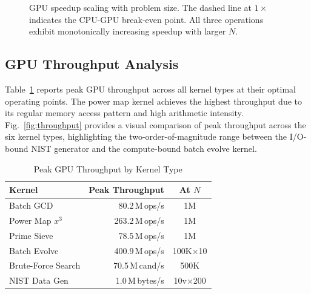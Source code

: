 \documentclass[lettersize,journal]{IEEEtran}
\begin{document}
\begin{figure}[!t]
\centering
{}
\caption{GPU speedup scaling with problem size. The dashed line at $1\times$ indicates the CPU-GPU break-even point. All three operations exhibit monotonically increasing speedup with larger $N$.}
\label{fig:speedup}
\end{figure}

\subsection{GPU Throughput Analysis}

Table~\ref{tab:throughput} reports peak GPU throughput across all kernel types at their optimal operating points. The power map kernel achieves the highest throughput due to its regular memory access pattern and high arithmetic intensity. Fig.~\ref{fig:throughput} provides a visual comparison of peak throughput across the six kernel types, highlighting the two-order-of-magnitude range between the I/O-bound NIST generator and the compute-bound batch evolve kernel.

\begin{table}[!t]
\caption{Peak GPU Throughput by Kernel Type\label{tab:throughput}}
\centering
\begin{tabular}{@{}lrc@{}}
\toprule
\textbf{Kernel} & \textbf{Peak Throughput} & \textbf{At $N$} \\
\midrule
Batch GCD           & 80.2\,M\,ops/s    & 1M \\
Power Map $x^3$     & 263.2\,M\,ops/s   & 1M \\
Prime Sieve         & 78.5\,M\,ops/s    & 1M \\
Batch Evolve        & 400.9\,M\,ops/s   & 100K$\times$10 \\
Brute-Force Search  & 70.5\,M\,cand/s   & 500K \\
NIST Data Gen       & 1.0\,M\,bytes/s   & 10v$\times$200 \\
\bottomrule
\end{tabular}
\end{table}
\end{document}
